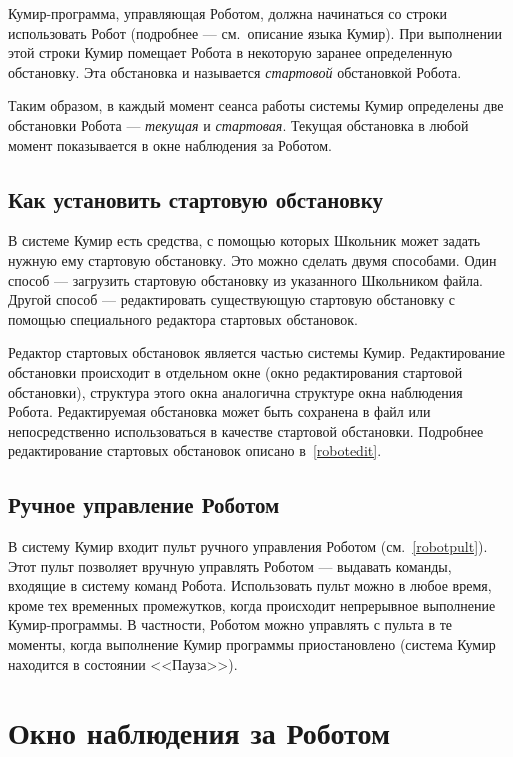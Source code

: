 Кумир-программа, управляющая Роботом, должна начинаться со строки \textsf{использовать \mbox{Робот}} (подробнее --- см.~описание языка Кумир). При выполнении этой строки Кумир помещает Робота в некоторую заранее определенную обстановку. Эта обстановка и называется \emph{стартовой} обстановкой Робота.

Таким образом, в каждый момент сеанса работы системы Кумир определены две обстановки Робота --- \emph{текущая} и \emph{стартовая}. Текущая обстановка в любой момент показывается в окне наблюдения за Роботом.

\subsection{Как установить стартовую обстановку}

В системе Кумир есть средства, с помощью которых Школьник может задать нужную ему стартовую обстановку. Это можно сделать двумя способами. Один способ --- загрузить стартовую обстановку из указанного Школьником файла. Другой способ --- редактировать существующую стартовую обстановку с помощью специального редактора стартовых обстановок.

Редактор стартовых обстановок является частью системы Кумир. Редактирование обстановки происходит в отдельном окне (окно редактирования стартовой обстановки), структура этого окна аналогична структуре окна наблюдения Робота. Редактируемая обстановка может быть сохранена в файл или непосредственно использоваться в качестве стартовой обстановки. Подробнее редактирование стартовых обстановок описано в~\ref{robotedit}.

\subsection{Ручное управление Роботом}

В систему Кумир входит пульт ручного управления Роботом (см.~\ref{robotpult}). Этот пульт позволяет вручную управлять Роботом --- выдавать команды, входящие в систему команд Робота. Использовать пульт можно в любое время, кроме тех временных промежутков, когда происходит непрерывное выполнение Кумир-программы. В частности, Роботом можно управлять с пульта в те моменты, когда выполнение Кумир программы приостановлено (система Кумир находится в состоянии <<Пауза>>).

\section{Окно наблюдения за Роботом}
\label{robotwindow}

